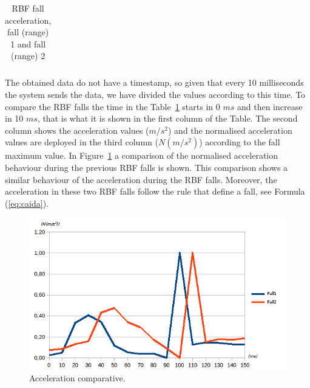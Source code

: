 \documentclass[journal]{IEEEtran}
\begin{document}
\begin{table}[!ht]
 \centering
 \begin{tabular}{*{5}{r}}
   
 \end{tabular}
 \caption{RBF fall acceleration, fall (range) 1 and fall (range) 2}%
 \label{tabla:RBF}
\end{table}

The obtained data do not have a timestamp, so given that every 10 milliseconds the system sends the data, we have
divided the values according to this time. To compare the RBF falls the time in the Table~\ref{tabla:RBF} 
starts in 0 $ms$ and then increase in 10 $ms$, that is what it is shown in 
the first column of the Table. The second column shows the acceleration values ($m/s^2$) and the normalised acceleration values
are deployed in the third column ($N(m/s^2)$) according to the fall maximum value. In 
Figure~\ref{fig:Sensor1} a comparison of the normalised acceleration behaviour during the previous RBF falls is shown. 
This comparison shows a similar behaviour of the acceleration during the RBF falls.
Moreover, the acceleration in these two RBF falls follow the rule that define a fall, see Formula (\ref{eq:caida}).

\begin{figure}[!ht]
  \centering
  \includegraphics[scale=0.45]{img/Comparativa}
  \caption[Acceleration comparative]{Acceleration comparative.}
  \label{fig:Sensor1}
\end{figure}
\end{document}
